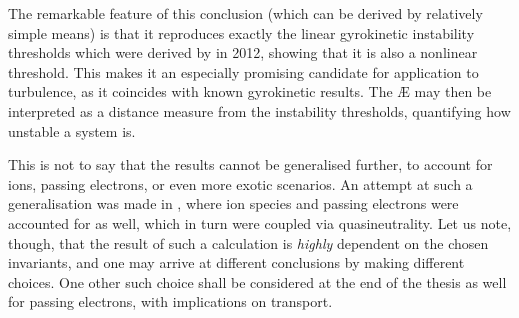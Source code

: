 The remarkable feature of this conclusion (which can be derived by relatively simple means) is that it reproduces exactly the linear gyrokinetic instability thresholds which were derived by \citet{proll2012resilience} in 2012, showing that it is also a nonlinear threshold. This makes it an especially promising candidate for application to turbulence, as it coincides with known gyrokinetic results. The \AE{} may then be interpreted as a distance measure from the instability thresholds, quantifying how unstable a system is. \par 

This is not to say that the results cannot be generalised further, to account for ions, passing electrons, or even more exotic scenarios. An attempt at such a generalisation was made in \cite{helander2020available}, where ion species and passing electrons were accounted for as well, which in turn were coupled via quasineutrality. Let us note, though, that the result of such a calculation is {\it highly} dependent on the chosen invariants, and one may arrive at different conclusions by making different choices. One other such choice shall be considered at the end of the thesis as well for passing electrons, with implications on transport. 